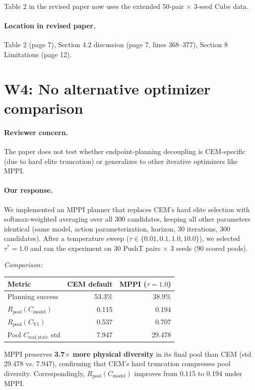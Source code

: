 \documentclass[11pt]{article}
\newcommand{\Rpool}{R_{\mathrm{pool}}}
\newcommand{\Cmodel}{C_{\mathrm{model}}}
\newcommand{\CVone}{C_{\mathrm{V1}}}
\newcommand{\Creal}{C_{\mathrm{real\_state}}}
\begin{document}
Table 2 in the revised paper now uses the extended 50-pair $\times$ 3-seed Cube data.

\paragraph{Location in revised paper.}
Table 2 (page 7), Section 4.2 discussion (page 7, lines 368--377), Section 8 Limitations (page 12).

\section*{W4: No alternative optimizer comparison}

\paragraph{Reviewer concern.}
The paper does not test whether endpoint-planning decoupling is CEM-specific (due to hard elite truncation) or generalizes to other iterative optimizers like MPPI.

\paragraph{Our response.}
We implemented an MPPI planner that replaces CEM's hard elite selection with softmax-weighted averaging over all 300 candidates, keeping all other parameters identical (same model, action parameterization, horizon, 30 iterations, 300 candidates). After a temperature sweep ($\tau \in \{0.01, 0.1, 1.0, 10.0\}$), we selected $\tau^* = 1.0$ and ran the experiment on 30 PushT pairs $\times$ 3 seeds (90 scored pools).

\textit{Comparison:}

\begin{center}
\begin{tabular}{lrr}
\toprule
Metric & CEM default & MPPI ($\tau=1.0$) \\
\midrule
Planning success & 53.3\% & 38.9\% \\
$\Rpool(\Cmodel)$ & 0.115 & 0.194 \\
$\Rpool(\CVone)$ & 0.537 & 0.707 \\
Pool $\Creal$ std & 7.947 & 29.478 \\
\bottomrule
\end{tabular}
\end{center}

MPPI preserves \textbf{3.7$\times$ more physical diversity} in its final pool than CEM (std 29.478 vs. 7.947), confirming that CEM's hard truncation compresses pool diversity. Correspondingly, $\Rpool(\Cmodel)$ improves from 0.115 to 0.194 under MPPI.
\end{document}
